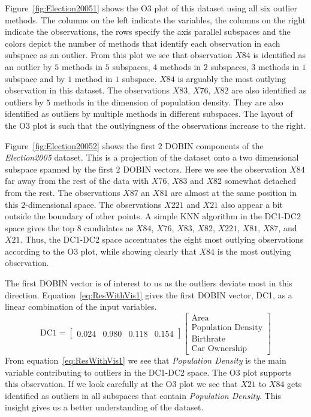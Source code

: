 \documentclass[letter,12pt]{article}
\begin{document}
Figure~\ref{fig:Election20051} shows the O3 plot of this dataset using all six outlier methods. The columns on the left indicate the variables, the columns on the right indicate the observations, the rows specify the axis parallel subspaces and the colors depict the number of methods that identify each observation in each subspace as an outlier. From this plot we see that observation $X84$ is identified as an outlier by $5$ methods in $5$ subspaces, $4$ methods in $2$ subspaces, $3$ methods in $1$ subspace and by $1$ method in $1$ subspace. $X84$ is arguably the most outlying observation in this dataset. The observations $X83$, $X76$, $X82$ are also identified as outliers by $5$ methods in the dimension of population density. They are also identified as outliers by multiple methods in different subspaces. The layout of the O3 plot is such that the outlyingness of the observations increase to the right.

Figure~\ref{fig:Election20052} shows the first $2$ DOBIN components of the \textit{Election2005} dataset. This is a projection of the dataset onto a two dimensional subspace spanned by the first $2$ DOBIN vectors. Here we see the observation $X84$ far away from the rest of the data with $X76$, $X83$ and $X82$ somewhat detached from the rest. The observations $X87$ an $X81$ are almost at the same position in this $2$-dimensional space. The observations $X221$ and $X21$ also appear a bit outside the boundary of other points. A simple KNN algorithm in the DC1-DC2 space gives the top $8$ candidates as $X84$, $X76$, $X83$, $X82$, $X221$, $X81$, $X87$, and $X21$. Thus, the DC1-DC2 space accentuates the eight most outlying observations according to the O3 plot, while showing clearly that $X84$ is the most outlying observation.

The first DOBIN vector is of interest to us as the outliers deviate most in this direction. Equation~\eqref{eq:ResWithVis1} gives the first DOBIN vector, DC1, as a linear combination of the input variables.
{\color{blue}
\begin{equation}\label{eq:ResWithVis1}
	\text{DC1} = \begin{bmatrix}
		0.024 & 0.980 & 0.118 & 0.154
	\end{bmatrix}
	\begin{bmatrix}
		\text{Area}               \\
		\text{Population Density} \\
		\text{Birthrate}          \\
		\text{Car Ownership}
	\end{bmatrix}
\end{equation}}
From equation~\eqref{eq:ResWithVis1} we see that \textit{Population Density} is the main variable contributing to outliers in the DC1-DC2 space. The O3 plot supports this observation. If we look carefully at the O3 plot we see that $X21$ to $X84$ gets identified as outliers in all subspaces that contain \textit{Population Density}. This insight gives us a better understanding of the dataset.
\end{document}
